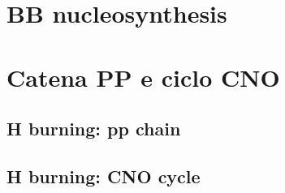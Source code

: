 \chapter{BB nucleosynthesis}
\PartialToc

\chapter{Catena PP e ciclo CNO}
\PartialToc

\section{H burning: pp chain}

\section{H burning: CNO cycle}
